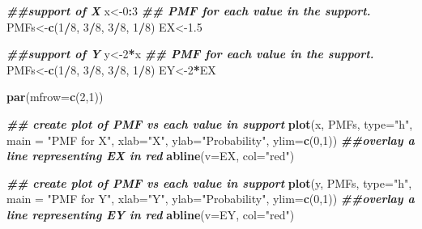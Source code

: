 \documentclass[
]{book}
\newenvironment{Shaded}{\begin{snugshade}}{\end{snugshade}}
\newcommand{\AttributeTok}[1]{\textcolor[rgb]{0.13,0.29,0.53}{#1}}
\newcommand{\DecValTok}[1]{\textcolor[rgb]{0.00,0.00,0.81}{#1}}
\newcommand{\DocumentationTok}[1]{\textcolor[rgb]{0.56,0.35,0.01}{\textbf{\textit{#1}}}}
\newcommand{\FloatTok}[1]{\textcolor[rgb]{0.00,0.00,0.81}{#1}}
\newcommand{\FunctionTok}[1]{\textcolor[rgb]{0.13,0.29,0.53}{\textbf{#1}}}
\newcommand{\NormalTok}[1]{#1}
\newcommand{\OtherTok}[1]{\textcolor[rgb]{0.56,0.35,0.01}{#1}}
\newcommand{\SpecialCharTok}[1]{\textcolor[rgb]{0.81,0.36,0.00}{\textbf{#1}}}
\newcommand{\StringTok}[1]{\textcolor[rgb]{0.31,0.60,0.02}{#1}}
\begin{document}
\begin{Shaded}
\begin{Highlighting}[]
\DocumentationTok{\#\#support of X}
\NormalTok{x}\OtherTok{\textless{}{-}}\DecValTok{0}\SpecialCharTok{:}\DecValTok{3}
\DocumentationTok{\#\# PMF for each value in the support. }
\NormalTok{PMFs}\OtherTok{\textless{}{-}}\FunctionTok{c}\NormalTok{(}\DecValTok{1}\SpecialCharTok{/}\DecValTok{8}\NormalTok{, }\DecValTok{3}\SpecialCharTok{/}\DecValTok{8}\NormalTok{, }\DecValTok{3}\SpecialCharTok{/}\DecValTok{8}\NormalTok{, }\DecValTok{1}\SpecialCharTok{/}\DecValTok{8}\NormalTok{)}
\NormalTok{EX}\OtherTok{\textless{}{-}}\FloatTok{1.5}

\DocumentationTok{\#\#support of Y}
\NormalTok{y}\OtherTok{\textless{}{-}}\DecValTok{2}\SpecialCharTok{*}\NormalTok{x}
\DocumentationTok{\#\# PMF for each value in the support. }
\NormalTok{PMFs}\OtherTok{\textless{}{-}}\FunctionTok{c}\NormalTok{(}\DecValTok{1}\SpecialCharTok{/}\DecValTok{8}\NormalTok{, }\DecValTok{3}\SpecialCharTok{/}\DecValTok{8}\NormalTok{, }\DecValTok{3}\SpecialCharTok{/}\DecValTok{8}\NormalTok{, }\DecValTok{1}\SpecialCharTok{/}\DecValTok{8}\NormalTok{)}
\NormalTok{EY}\OtherTok{\textless{}{-}}\DecValTok{2}\SpecialCharTok{*}\NormalTok{EX}

\FunctionTok{par}\NormalTok{(}\AttributeTok{mfrow=}\FunctionTok{c}\NormalTok{(}\DecValTok{2}\NormalTok{,}\DecValTok{1}\NormalTok{))}

\DocumentationTok{\#\# create plot of PMF vs each value in support}
\FunctionTok{plot}\NormalTok{(x, PMFs, }\AttributeTok{type=}\StringTok{"h"}\NormalTok{, }\AttributeTok{main =} \StringTok{"PMF for X"}\NormalTok{, }\AttributeTok{xlab=}\StringTok{"X"}\NormalTok{, }\AttributeTok{ylab=}\StringTok{"Probability"}\NormalTok{, }\AttributeTok{ylim=}\FunctionTok{c}\NormalTok{(}\DecValTok{0}\NormalTok{,}\DecValTok{1}\NormalTok{))}
\DocumentationTok{\#\#overlay a line representing EX in red}
\FunctionTok{abline}\NormalTok{(}\AttributeTok{v=}\NormalTok{EX, }\AttributeTok{col=}\StringTok{"red"}\NormalTok{)}

\DocumentationTok{\#\# create plot of PMF vs each value in support}
\FunctionTok{plot}\NormalTok{(y, PMFs, }\AttributeTok{type=}\StringTok{"h"}\NormalTok{, }\AttributeTok{main =} \StringTok{"PMF for Y"}\NormalTok{, }\AttributeTok{xlab=}\StringTok{"Y"}\NormalTok{, }\AttributeTok{ylab=}\StringTok{"Probability"}\NormalTok{, }\AttributeTok{ylim=}\FunctionTok{c}\NormalTok{(}\DecValTok{0}\NormalTok{,}\DecValTok{1}\NormalTok{))}
\DocumentationTok{\#\#overlay a line representing EY in red}
\FunctionTok{abline}\NormalTok{(}\AttributeTok{v=}\NormalTok{EY, }\AttributeTok{col=}\StringTok{"red"}\NormalTok{)}
\end{Highlighting}
\end{Shaded}
\end{document}

